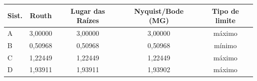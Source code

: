 \begin{tabular}{lcccc}
\hline
Sist. & Routh & Lugar das Raízes & Nyquist/Bode (MG) & Tipo de limite \\
\hline
A & 3{,}00000 & 3{,}00000 & 3{,}00000 & máximo \\
B & 0{,}50968 & 0{,}50968 & 0{,}50968 & mínimo \\
C & 1{,}22449 & 1{,}22449 & 1{,}22449 & máximo \\
D & 1{,}93911 & 1{,}93911 & 1{,}93902 & máximo \\
\hline
\end{tabular}
